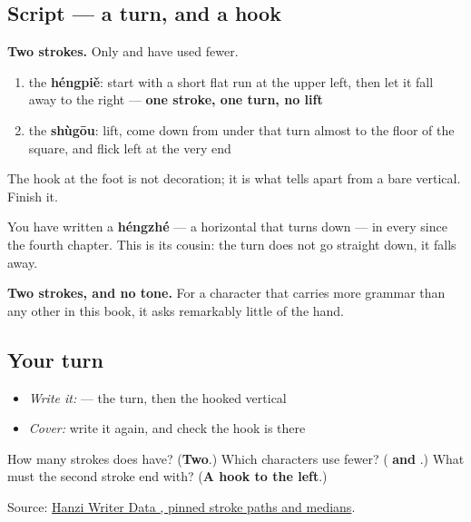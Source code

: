 \subsection*{Script — a turn, and a hook}

\begin{quote}
\end{quote}

\textbf{Two strokes.} Only  and  have used fewer.

\begin{enumerate}
\raggedright
  \item the \textbf{héngpiě}: start with a short flat run at the upper left, then let it fall away to the right — \textbf{one stroke, one turn, no lift}
  \item the \textbf{shùgōu}: lift, come down from under that turn almost to the floor of the square, and flick left at the very end
\end{enumerate}

The hook at the foot is not decoration; it is what tells  apart from a bare vertical. Finish it.

You have written a \textbf{héngzhé} — a horizontal that turns down — in every  since the fourth chapter. This is its cousin: the turn does not go straight down, it falls away.

\textbf{Two strokes, and no tone.} For a character that carries more grammar than any other in this book, it asks remarkably little of the hand.

\subsection*{Your turn}
\begin{itemize}
\raggedright
  \item \emph{Write it:}  — the turn, then the hooked vertical
  \item \emph{Cover:} write it again, and check the hook is there
\end{itemize}

\begin{tcolorbox}[breakable,colback=teal!4,colframe=teal!35!black,title={Before you move on}]
How many strokes does  have? (\textbf{Two}.) Which characters use fewer? (\textbf{ and }.) What must the second stroke end with? (\textbf{A hook to the left}.)

Source: \href{https://raw.githubusercontent.com/chanind/hanzi-writer-data/68d10a4b21150cae5e1ebbd223eed289cf32d90c/data/\%E4\%BA\%86.json}{Hanzi Writer Data , pinned stroke paths and medians}.
\end{tcolorbox}
